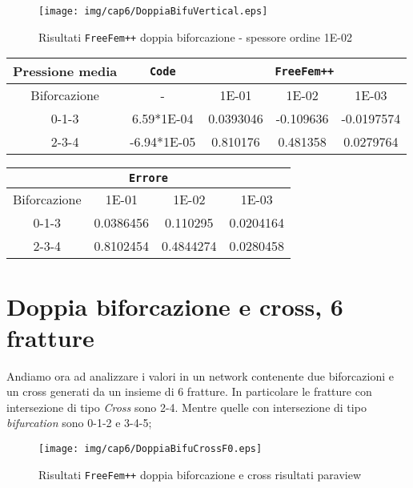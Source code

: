 \begin{figure}[h!]
\centering
\texttt{[image: img/cap6/DoppiaBifuVertical.eps]}
\caption{Risultati \texttt{FreeFem++} doppia biforcazione - spessore ordine 1E-02 }\label{DoppiaBifuVertical1E-02}
\end{figure}

\begin{center}
\begin{tabular}{|c|c|c|c|c|}
\hline
 Pressione media & \textbf{\texttt{Code}} & \multicolumn{3}{|c|}{\textbf{\texttt{FreeFem++}}} \\ 
\hline
\multicolumn{1}{|c|}{Biforcazione} & - &
\multicolumn{1}{|c|}{1E-01} & 1E-02 & 1E-03 \\
\hline
  0-1-3 & 6.59*1E-04 & 0.0393046 & -0.109636 & -0.0197574 \\
  2-3-4 & -6.94*1E-05 & 0.810176 & 0.481358 & 0.0279764 \\
\hline
\end{tabular}
\end{center}

\begin{center}
\begin{tabular}{|c|c|c|c|}
\hline
  \multicolumn{4}{|c|}{\textbf{\texttt{Errore}}} \\ 
\hline
\multicolumn{1}{|c|}{Biforcazione} &
\multicolumn{1}{|c|}{1E-01} & 1E-02 & 1E-03 \\
\hline
  0-1-3 &  0.0386456 & 0.110295 & 0.0204164 \\
  2-3-4 & 0.8102454 & 0.4844274 & 0.0280458 \\
\hline
\end{tabular}
\end{center}


\section{Doppia biforcazione e cross, 6 fratture}
Andiamo ora ad analizzare i valori in un network contenente due biforcazioni e un cross generati da un insieme di 6 fratture. In particolare le fratture con intersezione di tipo \textit{Cross} sono 2-4. Mentre quelle con intersezione di tipo \textit{bifurcation} sono 0-1-2 e 3-4-5;\\

\begin{figure}[h!]
\centering
\texttt{[image: img/cap6/DoppiaBifuCrossF0.eps]}
\caption{Risultati \texttt{FreeFem++} doppia biforcazione e cross risultati paraview }\label{DoppiaBifuCrossParaview}
\end{figure}

